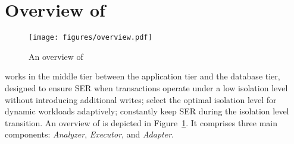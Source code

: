 \section{Overview of \sysname}
\label{sec:overview}

\begin{figure}[t]
    \centering
    \texttt{[image: figures/overview.pdf]}
    \vspace{-2mm}
    \caption{An overview of \sysname}
    \label{fig:overview}
    \vspace{-4mm}
\end{figure}

\sysname works in the middle tier between the application tier and the database tier, designed to  ensure SER when transactions operate under a low isolation level without introducing additional writes;  select the optimal isolation level for dynamic workloads adaptively;  constantly keep SER during the isolation level transition. 
An overview of \sysname is depicted in Figure~\ref{fig:overview}. It comprises three main components: \textit{Analyzer}, \textit{Executor}, and \textit{Adapter}. 



